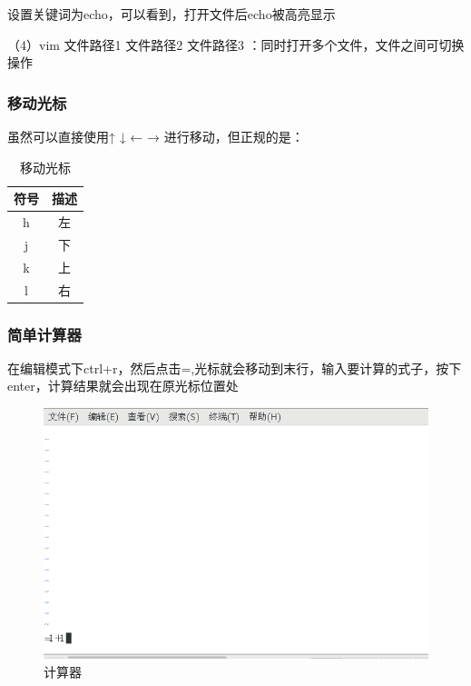 \documentclass{ctexart}
\begin{document}
	设置关键词为echo，可以看到，打开文件后echo被高亮显示
	
	（4）vim 文件路径1 文件路径2 文件路径3 ：同时打开多个文件，文件之间可切换操作
	
	\subsubsection{移动光标}
	虽然可以直接使用↑ ↓ ← → 进行移动，但正规的是：
	
	\begin{table}[h]
		\centering
		\caption{移动光标}
		\begin{tabular}{|c|c|}
			\hline
			符号 & 描述  \\
			\hline
			h & 左 \\
			\hline
			j & 下\\
			\hline
			k &上\\ 
			\hline
			l & 右\\
			\hline
		\end{tabular}
	\end{table}

	
	\subsubsection{简单计算器}
	在编辑模式下ctrl+r，然后点击=,光标就会移动到末行，输入要计算的式子，按下enter，计算结果就会出现在原光标位置处
	
	\begin{figure}[H]
		\centering
		\includegraphics[scale=0.5]{2.38}
		\caption{计算器}
	\end{figure}
	
\end{document}

